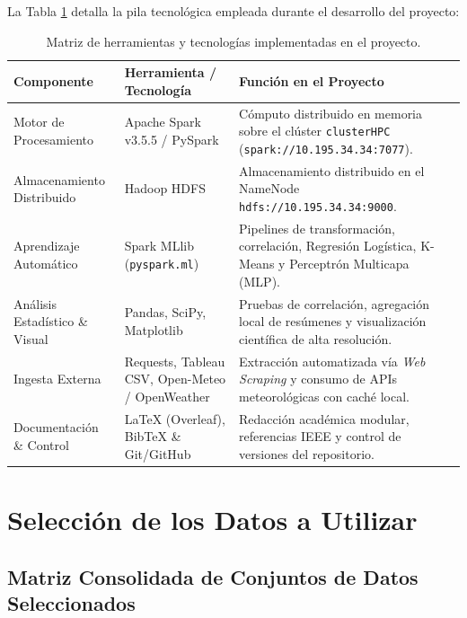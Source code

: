 \documentclass[11pt,a4paper]{article}
\begin{document}
La Tabla \ref{tab:tecnologias} detalla la pila tecnológica empleada durante el desarrollo del proyecto:

\begin{table}[H]
\centering
\small
\renewcommand{\arraystretch}{1.25}
\begin{tabularx}{\textwidth}{p{3.8cm} p{4.2cm} X}
\toprule
\textbf{Componente} & \textbf{Herramienta / Tecnología} & \textbf{Función en el Proyecto} \\
\midrule
Motor de Procesamiento & Apache Spark v3.5.5 / PySpark & Cómputo distribuido en memoria sobre el clúster \texttt{clusterHPC} (\texttt{spark://10.195.34.34:7077}). \\
Almacenamiento Distribuido & Hadoop HDFS & Almacenamiento distribuido en el NameNode \texttt{hdfs://10.195.34.34:9000}. \\
Aprendizaje Automático & Spark MLlib (\texttt{pyspark.ml}) & Pipelines de transformación, correlación, Regresión Logística, K-Means y Perceptrón Multicapa (MLP). \\
Análisis Estadístico \& Visual & Pandas, SciPy, Matplotlib & Pruebas de correlación, agregación local de resúmenes y visualización científica de alta resolución. \\
Ingesta Externa & Requests, Tableau CSV, Open-Meteo / OpenWeather & Extracción automatizada vía \textit{Web Scraping} y consumo de APIs meteorológicas con caché local. \\
Documentación \& Control & \LaTeX{} (Overleaf), BibTeX \& Git/GitHub & Redacción académica modular, referencias IEEE y control de versiones del repositorio. \\
\bottomrule
\end{tabularx}
\caption{Matriz de herramientas y tecnologías implementadas en el proyecto.}
\label{tab:tecnologias}
\end{table}



\section{Selección de los Datos a Utilizar}
\label{sec:seleccion_datos}

\subsection{Matriz Consolidada de Conjuntos de Datos Seleccionados}
\end{document}
